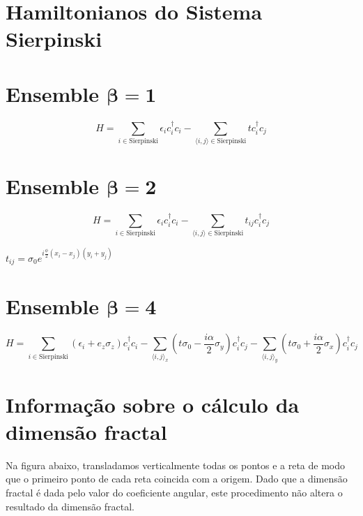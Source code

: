 \documentclass{article}
\begin{document}
	
	\section*{Hamiltonianos do Sistema Sierpinski}
	

	\section*{Ensemble $\mathbf{\beta=1}$}
	\begin{equation}
		H=\sum_{i\in \text{Sierpinski}}\epsilon_{i}c_{i}^{\dagger}c_{i}-\sum_{\langle i,j\rangle\in \text{Sierpinski}}tc_{i}^{\dagger}c_{j}
	\end{equation}
	

	\section*{Ensemble $\mathbf{\beta=2}$}
	\begin{equation}
		H=\sum_{i\in \text{Sierpinski}}\epsilon_{i}c_{i}^{\dagger}c_{i}-\sum_{\langle i,j\rangle\in \text{Sierpinski}}t_{ij}c_{i}^{\dagger}c_{j}
	\end{equation}
	
	$t_{ij}=\sigma_{0}e^{i\frac{\phi}{2}(x_{i}-x_{j})(y_{i}+y_{j})}$
	

	\section*{Ensemble $\mathbf{\beta=4}$}
	\begin{equation}
		H=\sum_{i\in \text{Sierpinski}}(\epsilon_{i}+e_{z}\sigma_{z})c_{i}^{\dagger}c_{i}-\sum_{\langle i,j\rangle_{x}}(t\sigma_{0}-\frac{i\alpha}{2}\sigma_{y})c_{i}^{\dagger}c_{j}-\sum_{\langle i,j\rangle_{y}}(t\sigma_{0}+\frac{i\alpha}{2}\sigma_{x})c_{i}^{\dagger}c_{j}
	\end{equation}
	
	\vspace*{1cm}
	
	\section*{Informação sobre o cálculo da dimensão fractal}
	
	Na figura abaixo, transladamos verticalmente todas os pontos e a reta de modo que o primeiro ponto de cada reta coincida com a origem. Dado que a dimensão fractal é dada pelo valor do coeficiente angular, este procedimento não altera o resultado da dimensão fractal. 
	
\end{document}

